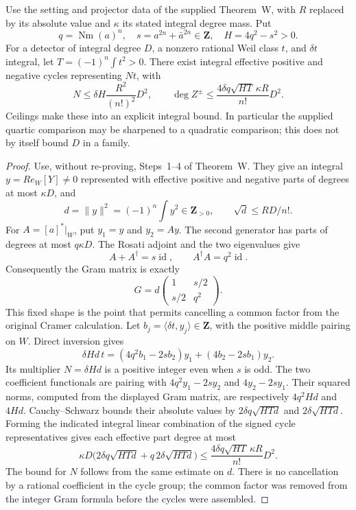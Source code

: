 \begin{theorem}
\label{HD-WQ}
Use the setting and projector data of the supplied Theorem~W, with
$R$ replaced by its absolute value and $\kappa$ its stated integral
degree mass. Put
\[
 q=\operatorname{Nm}(a)^n,\quad
 s=a^{2n}+\bar a^{2n}\in\mathbf Z,\quad H=4q^2-s^2>0.
\]
For a detector of integral degree $D$, a nonzero rational Weil class
$t$, and $\delta t$ integral, let $T=(-1)^n\int t^2>0$.
There exist integral effective positive and negative cycles representing
$Nt$, with
\[
 N\le\delta H\frac{R^2}{(n!)^2}D^2,
 \qquad
 \deg Z^\pm\le
 \frac{4\delta q\sqrt{HT}\,\kappa R}{n!}D^2.
\]
Ceilings make these into an explicit integral bound. In particular
the supplied quartic comparison may be sharpened to a quadratic
comparison; this does not by itself bound $D$ in a family.
\end{theorem}
\begin{proof}
Use, without re-proving, Steps~1--4 of Theorem~W. They give an
integral $y=R e_W[Y]\ne0$ represented with effective positive and
negative parts of degrees at most $\kappa D$, and
\[
 d=\lVert y\rVert^2=(-1)^n\int y^2\in\mathbf Z_{>0},
 \qquad \sqrt d\le RD/n!.
\]
For $A=[a]^*|_W$, put $y_1=y$ and $y_2=Ay$.
The second generator has parts of degrees at most $q\kappa D$.
The Rosati adjoint and the two eigenvalues give
\[
 A+A^\dagger=s\operatorname{id},\qquad
 A^\dagger A=q^2\operatorname{id}.
\]
Consequently the Gram matrix is exactly
\[
 G=d\begin{pmatrix}1&s/2\\s/2&q^2\end{pmatrix}.
\]
This fixed shape is the point that permits cancelling a common
factor from the original Cramer calculation.
Let $b_j=\langle\delta t,y_j\rangle\in\mathbf Z$, with the positive
middle pairing on $W$. Direct inversion gives
\[
 \delta Hd\,t=(4q^2b_1-2sb_2)y_1+(4b_2-2sb_1)y_2.
\]
Its multiplier $N=\delta Hd$ is a positive integer even when $s$ is odd.
The two coefficient functionals are pairing with
$4q^2y_1-2sy_2$ and $4y_2-2sy_1$. Their squared norms, computed
from the displayed Gram matrix, are respectively $4q^2Hd$ and
$4Hd$. Cauchy--Schwarz bounds their absolute values by
$2\delta q\sqrt{HTd}$ and $2\delta\sqrt{HTd}$.
Forming the indicated integral linear combination of the signed
cycle representatives gives each effective part degree at most
\[
 \kappa D\bigl(2\delta q\sqrt{HTd}
             +q\,2\delta\sqrt{HTd}\bigr)
 \le\frac{4\delta q\sqrt{HT}\,\kappa R}{n!}D^2.
\]
The bound for $N$ follows from the same estimate on $d$.
There is no cancellation by a rational coefficient in the cycle group;
the common factor was removed from the integer Gram formula before
the cycles were assembled.
\end{proof}

